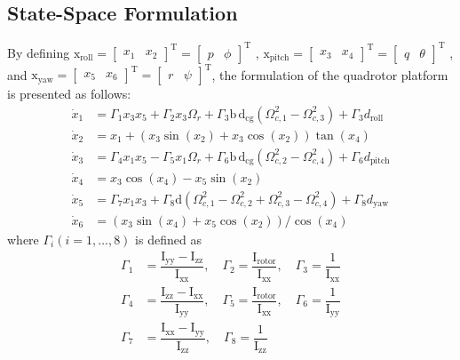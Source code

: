 \documentclass[3p]{elsarticle}
\begin{document}
\subsection{State-Space Formulation}\label{sec:state-space}
\noindent By defining $\boldsymbol{\mathrm{x}}_{\text{roll}} = \begin{bmatrix}
	x_1 & x_2
\end{bmatrix}^{\mathrm{T}}=
\begin{bmatrix}
	p & \phi
\end{bmatrix}^{\mathrm{T}}$
,
$\boldsymbol{\mathrm{x}}_{\text{pitch}} = \begin{bmatrix}
	x_3 & x_4 \end{bmatrix}^{\mathrm{T}} = 
	\begin{bmatrix}
	q & \theta \end{bmatrix}^{\mathrm{T}}
	$
	, and 
	$\boldsymbol{\mathrm{x}}_{\text{yaw}} = 
	\begin{bmatrix}
		x_5 & x_6
	\end{bmatrix}^{\mathrm{T}} = 
	\begin{bmatrix}
		r & \psi
	\end{bmatrix}^{\mathrm{T}}$, the formulation of the quadrotor platform is presented as follows:
\begin{align}\label{eq:diffeq}
	\dot x_1 &= \Gamma_1x_3 x_5 + \Gamma_2 x_3 \Omega_r + \Gamma_3\mathrm{b\,d}_{\text{cg}} (\Omega_{c, 1}^2 - \Omega_{c, 3}^2) + \Gamma_3d_{\text{roll}} \\[0.5em]
	\dot x_2 &= x_1 + (x_3\sin(x_2) + x_3\cos(x_2))\tan(x_4)
    \\[0.5em]
    \dot x_3 &= \Gamma_4 x_1 x_5 - \Gamma_5 x_1 \Omega_r +  \Gamma_6\mathrm{b\,d}_{\text{cg}} (\Omega_{c, 2}^2 - \Omega_{c, 4}^2) + \Gamma_6d_{\text{pitch}}\\[0.5em] \label{eq:diffeq-mid}
	\dot x_4 &= x_3\cos(x_4) - x_5\sin(x_2)\\[0.5em]
    \dot x_5 &= \Gamma_7x_1 x_3 +  \Gamma_8\mathrm{d} (\Omega_{c, 1}^2 - \Omega_{c, 2}^2 + \Omega_{c, 3}^2 - \Omega_{c, 4}^2) + \Gamma_8d_{\text{yaw}}\\[0.5em] 
    \dot x_6 &= (x_3\sin(x_4) + x_5\cos(x_2))/\cos(x_4) \label{eq:diffeq-end}
\end{align}
where $\Gamma_i (i = 1, \ldots, 8)$ is defined as
\begin{equation}
	\begin{split}
		\Gamma_1 &= \dfrac{\mathrm{I}_{\text{yy}} - \mathrm{I}_{\text{zz}}}{\mathrm{I}_{\text{xx}}}, \quad \Gamma_2 = \dfrac{\mathrm{I}_{\text{rotor}}}{\mathrm{I}_{\text{xx}}}, \quad \Gamma_3 = \dfrac{1}{\mathrm{I}_{\text{xx}}}\\ \Gamma_4 &= \dfrac{\mathrm{I}_{\text{zz}} - \mathrm{I}_{\text{xx}}}{\mathrm{I}_{\text{yy}}}, \quad \Gamma_5 = \dfrac{\mathrm{I}_{\text{rotor}}}{\mathrm{I}_{\text{xx}}}, \quad \Gamma_6 = \dfrac{1}{\mathrm{I}_{\text{yy}}} \\ \Gamma_7 &= \dfrac{\mathrm{I}_{\text{xx}} - \mathrm{I}_{\text{yy}}}{\mathrm{I}_{\text{zz}}}, \quad \Gamma_8 = \dfrac{1}{\mathrm{I}_{\text{zz}}}
	\end{split}
\end{equation}
\end{document}
